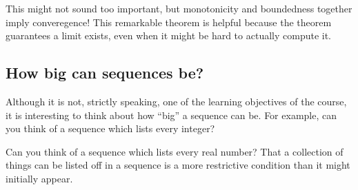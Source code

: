 \documentclass{ximera}
\begin{document}
This might not sound too important, but monotonicity and boundedness together imply converegence!  This remarkable theorem is  helpful because the theorem guarantees a limit exists, even when it might be hard to actually compute it.

\subsection{How big can sequences be?}

Although it is not, strictly speaking, one of the learning objectives of the course, it is interesting to think about how ``big'' a sequence can be.  For example, can you think of a sequence which lists every integer?


Can you think of a sequence which lists every real number?  That a collection of things can be listed off in a sequence is a more restrictive condition than it might initially appear.

\end{document}
